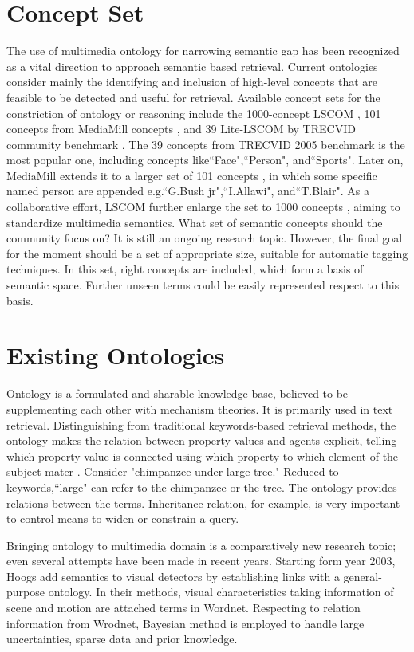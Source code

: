 \section{Concept Set}
The use of multimedia ontology for narrowing semantic gap has been
recognized as a vital direction to approach semantic based
retrieval. Current ontologies consider mainly the identifying and
inclusion of high-level concepts that are feasible to be detected
and useful for retrieval. Available concept sets for the
constriction of ontology or reasoning include the 1000-concept LSCOM
\cite{Milind.Naphade:IEEEMM:2006}, 101 concepts from MediaMill
concepts \cite{CeesG.M.Snoek:ACMMM:2006}, and 39 Lite-LSCOM by
TRECVID community benchmark \cite{M.R.Naphade:2005}. The 39 concepts
from TRECVID 2005 benchmark is the most popular one, including
concepts like``Face",``Person", and``Sports". Later on, MediaMill
extends it to a larger set of 101 concepts
\cite{CeesG.M.Snoek:ACMMM:2006}, in which some specific named person
are appended e.g.``G.Bush jr",``I.Allawi", and``T.Blair". As a
collaborative effort, LSCOM further enlarge the set to 1000 concepts
\cite{Milind.Naphade:IEEEMM:2006}, aiming to standardize multimedia
semantics. What set of semantic concepts should the community focus
on? It is still an ongoing research topic. However, the final goal
for the moment should be a set of appropriate size, suitable for
automatic tagging techniques. In this set, right concepts are
included, which form a basis of semantic space. Further unseen terms
could be easily represented respect to this basis.

\section{Existing Ontologies}
Ontology is a formulated and sharable knowledge base, believed to be
supplementing each other with mechanism theories. It is primarily
used in text retrieval. Distinguishing from traditional
keywords-based retrieval methods, the ontology makes the relation
between property values and agents explicit, telling which property
value is connected using which property to which element of the
subject mater \cite{A.Th.(Guus).Schreiber:IEEEIS:2001}. Consider
"chimpanzee under large tree." Reduced to keywords,``large" can
refer to the chimpanzee or the tree. The ontology provides relations
between the terms. Inheritance relation, for example, is very
important to control means to widen or constrain a query.

Bringing ontology to multimedia domain is a comparatively new
research topic; even several attempts have been made in recent
years. Starting form year 2003, Hoogs \cite{Anthony.Hoogs:CVPR:2003}
add semantics to visual detectors by establishing links with a
general-purpose ontology. In their methods, visual characteristics
taking information of scene and motion are attached terms in
Wordnet. Respecting to relation information from Wrodnet, Bayesian
method is employed to handle large uncertainties, sparse data and
prior knowledge.

